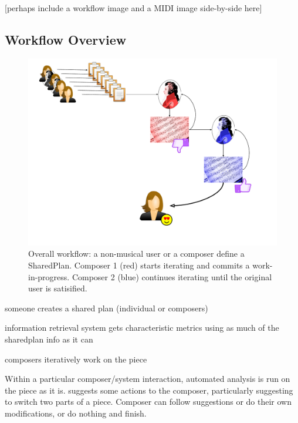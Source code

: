 \documentclass[final,authoryear,5p,times,twocolumn]{elsarticle}
\begin{document}
[perhaps include a workflow image and a MIDI image side-by-side here]

\subsection{Workflow Overview}


\begin{figure}
	\includegraphics[scale=0.35]{workflow.pdf}
	\caption{Overall workflow: a non-musical user or a composer define a SharedPlan. Composer 1 (red) starts
	iterating and commits a work-in-progress. Composer 2 (blue) continues iterating until the original user is
	satisified.}
	\label{fig:workflow}
\end{figure}


someone creates a shared plan (individual or composers)

information retrieval system gets characteristic metrics using as much of the sharedplan info as it can

composers iteratively work on the piece

Within a particular composer/system interaction, automated analysis is run on the piece as it is.
suggests some actions to the composer, particularly suggesting to switch two parts of a piece.
Composer can follow suggestions or do their own modifications, or do nothing and finish.
\end{document}
